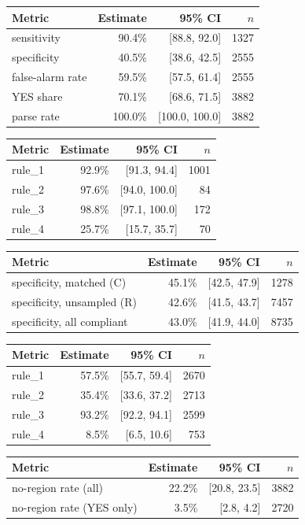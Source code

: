 \begin{tabular}{lrrr}
\toprule
Metric & Estimate & 95\% CI & $n$ \\
\midrule
sensitivity & 90.4\% & [88.8, 92.0] & 1327 \\
specificity & 40.5\% & [38.6, 42.5] & 2555 \\
false-alarm rate & 59.5\% & [57.5, 61.4] & 2555 \\
YES share & 70.1\% & [68.6, 71.5] & 3882 \\
parse rate & 100.0\% & [100.0, 100.0] & 3882 \\
\bottomrule
\end{tabular}

\begin{tabular}{lrrr}
\toprule
Metric & Estimate & 95\% CI & $n$ \\
\midrule
rule\_1 & 92.9\% & [91.3, 94.4] & 1001 \\
rule\_2 & 97.6\% & [94.0, 100.0] & 84 \\
rule\_3 & 98.8\% & [97.1, 100.0] & 172 \\
rule\_4 & 25.7\% & [15.7, 35.7] & 70 \\
\bottomrule
\end{tabular}

\begin{tabular}{lrrr}
\toprule
Metric & Estimate & 95\% CI & $n$ \\
\midrule
specificity, matched (C) & 45.1\% & [42.5, 47.9] & 1278 \\
specificity, unsampled (R) & 42.6\% & [41.5, 43.7] & 7457 \\
specificity, all compliant & 43.0\% & [41.9, 44.0] & 8735 \\
\bottomrule
\end{tabular}

\begin{tabular}{lrrr}
\toprule
Metric & Estimate & 95\% CI & $n$ \\
\midrule
rule\_1 & 57.5\% & [55.7, 59.4] & 2670 \\
rule\_2 & 35.4\% & [33.6, 37.2] & 2713 \\
rule\_3 & 93.2\% & [92.2, 94.1] & 2599 \\
rule\_4 & 8.5\% & [6.5, 10.6] & 753 \\
\bottomrule
\end{tabular}

\begin{tabular}{lrrr}
\toprule
Metric & Estimate & 95\% CI & $n$ \\
\midrule
no-region rate (all) & 22.2\% & [20.8, 23.5] & 3882 \\
no-region rate (YES only) & 3.5\% & [2.8, 4.2] & 2720 \\
\bottomrule
\end{tabular}

